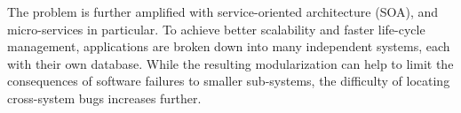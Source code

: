 The problem is further amplified with service-oriented architecture (SOA), and micro-services in particular.
To achieve better scalability and faster life-cycle management, applications are broken down into many independent systems, each with their own database.
While the resulting modularization can help to limit the consequences of software failures to smaller sub-systems, the difficulty of locating cross-system bugs increases further.

